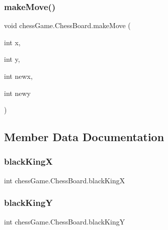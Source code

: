 \hypertarget{classchess_game_1_1_chess_board_a14a29737ff8ff4fcbb08b87e9f91f385}{}\label{classchess_game_1_1_chess_board_a14a29737ff8ff4fcbb08b87e9f91f385} 
\subsubsection{\texorpdfstring{make\+Move()}{makeMove()}}
{\footnotesize\ttfamily void chess\+Game.\+Chess\+Board.\+make\+Move (\begin{DoxyParamCaption}\item[{int}]{x,  }\item[{int}]{y,  }\item[{int}]{newx,  }\item[{int}]{newy }\end{DoxyParamCaption})}



\subsection{Member Data Documentation}
\hypertarget{classchess_game_1_1_chess_board_acf7d7d0beb32c7eb5f180e2666866193}{}\label{classchess_game_1_1_chess_board_acf7d7d0beb32c7eb5f180e2666866193} 
\subsubsection{\texorpdfstring{black\+KingX}{blackKingX}}
{\footnotesize\ttfamily int chess\+Game.\+Chess\+Board.\+black\+KingX\hspace{0.3cm}{\ttfamily [private]}}

\hypertarget{classchess_game_1_1_chess_board_a0e5e5606cb430679898f945204c27c94}{}\label{classchess_game_1_1_chess_board_a0e5e5606cb430679898f945204c27c94} 
\subsubsection{\texorpdfstring{black\+KingY}{blackKingY}}
{\footnotesize\ttfamily int chess\+Game.\+Chess\+Board.\+black\+KingY\hspace{0.3cm}{\ttfamily [private]}}

